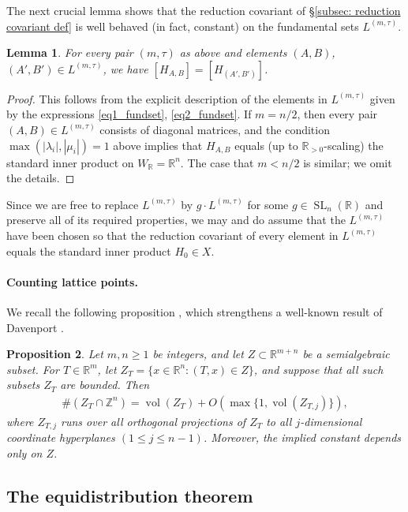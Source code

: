 \documentclass{article} %
\newtheorem{proposition}{Proposition}[section]
\newtheorem{lemma}[proposition]{Lemma}
\numberwithin{equation}{section}
\DeclareMathOperator{\SL}{SL}
\DeclareMathOperator{\Vol}{vol}
\newcommand{\R}{\mathbb{R}}
\newcommand{\Z}{\mathbb{Z}}
\begin{document}
The next crucial lemma shows that the reduction covariant of \S\ref{subsec: reduction covariant def} is well behaved (in fact, constant) on the fundamental sets $L^{(m,\tau)}$.
\begin{lemma}\label{lem_reduction_covariant_constant_on_section}
    For every pair $(m,\tau)$ as above and elements $(A,B)$, $(A',B')\in L^{(m,\tau)}$, we have $[H_{A,B}] = [H_{(A',B')}]$.
\end{lemma}
\begin{proof}
    This follows from the explicit description of the elements in $L^{(m,\tau)}$ given by the expressions \eqref{eq1_fundset}, \eqref{eq2_fundset}.
    If $m=n/2$, then every pair $(A,B) \in L^{(m,\tau)}$ consists of diagonal matrices, and the condition $\max(|\lambda_i|, |\mu_i|)=1$ above implies that $H_{A,B}$ equals (up to $\R_{>0}$-scaling) the standard inner product on $W_{\R} = \R^n$.
    The case that $m<n/2$ is similar; we omit the details.
\end{proof}

Since we are free to replace $L^{(m,\tau)}$ by $g\cdot L^{(m,\tau)}$ for some $g\in \SL_n(\R)$ and preserve all of its required properties, we may and do assume that the $L^{(m,\tau)}$ have been chosen so that the reduction covariant of every element in $L^{(m,\tau)}$ equals the standard inner product $H_0 \in X$.


\paragraph{Counting lattice points.}


We recall the following proposition \cite[Theorem 1.3]{BarroeroWidmer-lattice}, which strengthens a well-known result of Davenport \cite{Davenport-onaresultofLipschitz}.
\begin{proposition}\label{prop_countlatticepointsbarroero}
	Let $m,n\geq 1$ be integers, and let $Z\subset \R^{m+n}$ be a semialgebraic subset. 
	For $T\in \R^m$, let $Z_T = \{x\in \R^n\colon (T,x) \in Z\}$, and suppose that all such subsets $Z_T$ are bounded.
	Then
	\begin{align*}
		\#(Z_T \cap \Z^n) = \Vol(Z_T)+O(\max\{1,\Vol(Z_{T,j})\}),
	\end{align*}
	where $Z_{T,j}$ runs over all orthogonal projections of $Z_T$ to all $j$-dimensional coordinate hyperplanes $(1\leq j \leq n-1)$. 
	Moreover, the implied constant depends only on $Z$. 
 \end{proposition}


\subsection{The equidistribution theorem}\label{subsec_equidistributiontheorem}
\end{document}
